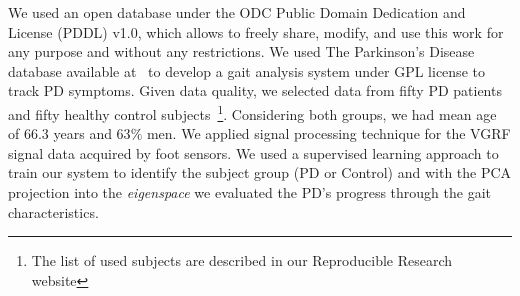 \documentclass[10pt, conference, compsocconf]{IEEEtran}
\begin{document}







We used an open database under the ODC Public Domain Dedication and License (PDDL) v1.0, which allows to freely share, modify, and use this work for any purpose and without any restrictions. We used The Parkinson's Disease database available at~\cite{physionet} to develop a gait analysis system under GPL license to track PD symptoms. Given data quality, we selected data from fifty PD patients and fifty healthy control subjects~\footnote{The list of used subjects are described in our Reproducible Research website}. Considering both groups, we had mean age of 66.3 years and 63$\%$ men. We applied signal processing technique for the VGRF signal data acquired by foot sensors. We used a supervised learning approach to train our system to identify the subject group (PD or Control) and with the PCA projection into the \textit{eigenspace} we evaluated the PD's progress through the gait characteristics.
%
%
%
%
%
%
%
\end{document}
